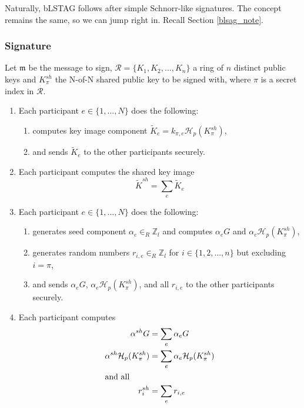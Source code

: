 Naturally, bLSTAG follows after simple Schnorr-like signatures. The concept remains the same, so we can jump right in. Recall Section \ref{blsag_note}.

\subsubsection*{Signature}

Let \(\mathfrak{m}\) be the message to sign, \(\mathcal{R} = \{K_1, K_2, ..., K_n\}\) a ring of $n$ distinct public keys and \(K^{sh}_\pi\) the N-of-N shared public key to be signed with, where $\pi$ is a secret index in $\mathcal{R}$.

\begin{enumerate}
    \item Each participant $e \in \{1,...,N\}$ does the following:
    \begin{enumerate}
        \item computes key image component $\tilde{K}_e = k_{\pi,e} \mathcal{H}_p(K^{sh}_\pi)$,
        \item and sends $\tilde{K}_e$ to the other participants securely.
    \end{enumerate}
    \item Each participant computes the shared key image 
    \[\tilde{K}^{sh} = \sum_e \tilde{K}_e\]
	
	\item Each participant $e \in \{1,...,N\}$ does the following:
	\begin{enumerate}
	    \item generates seed component $\alpha_e \in_R \mathbb{Z}_l$ and computes $\alpha_e G$ and $\alpha_e \mathcal{H}_p(K^{sh}_\pi)$,
	    \item generates random numbers \(r_{i,e} \in_R \mathbb{Z}_l\) for \(i \in \{1, 2, ..., n\}\) but excluding \(i = \pi\),
	    \item and sends $\alpha_e G$, $\alpha_e \mathcal{H}_p(K^{sh}_\pi)$, and all $r_{i,e}$ to the other participants securely.
	\end{enumerate}
	\item Each participant computes
	\begin{align*}
	                    \alpha^{sh} G &= \sum_e \alpha_e G \\
\alpha^{sh} \mathcal{H}_p(K^{sh}_\pi) &= \sum_e \alpha_e \mathcal{H}_p(K^{sh}_\pi) \\
\intertext{and all }         r^{sh}_i &= \sum_e r_{i,e}
	\end{align*}
	

\end{enumerate}
